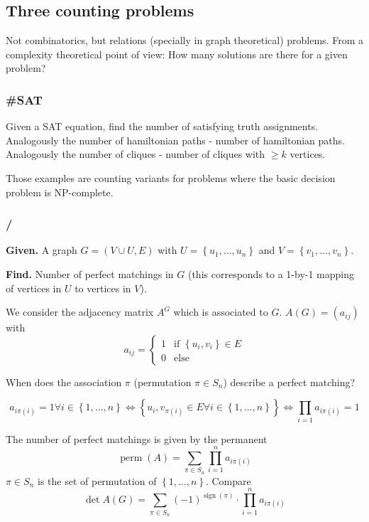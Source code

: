 \documentclass[a4paper]{article}
\newcommand{\given}[1]{\textbf{Given.} #1\par}
\newcommand{\find}[1]{\textbf{Find.} #1\par}
\newcommand{\cls}[1]{\rm{#1}}
\newcommand{\probl}[1]{\text{\textsc{#1}}}
\newcommand{\set}[1]{\left\{#1\right\}}
\newenvironment{spec}[0]{\begin{framed}}{\end{framed}}
\DeclareMathOperator{\detm}{det}
\begin{document}
\subsection{Three counting problems}
%
Not combinatorics, but relations (specially in graph theoretical) problems.
From a complexity theoretical point of view: How many solutions are there
for a given problem?

\subsubsection{\#SAT}
%
Given a SAT equation, find the number of satisfying truth assignments.
Analogously the number of hamiltonian paths - number of hamiltonian paths.
Analogously the number of cliques - number of cliques with $\geq k$ vertices.

Those examples are counting variants for problems where the basic decision problem
is \cls{NP}-complete.

\subsubsection{\probl{\#Matching} / \probl{Permanent}}
%
\begin{spec}
  \given{
    A graph $G = (V \cup U, E)$ with $U = \set{u_1, \ldots, u_n}$
    and $V = \set{v_1, \ldots, v_n}$.
  }
  \find{
    Number of perfect matchings in $G$
    (this corresponds to a 1-by-1 mapping of vertices in $U$ to vertices in $V$).
  }
\end{spec}

We consider the adjacency matrix $A^G$ which is associated to $G$.
$A(G) = (a_{ij})$ with \[
    a_{ij} = \begin{cases}
        1  & \text{if } \set{u_i, v_i} \in E \\
        0  & \text{else}
    \end{cases}
\]

When does the association $\pi$ (permutation $\pi \in S_n$) describe a perfect matching?

\[
    a_{i\pi(i)} = 1  \forall i \in \set{1, \ldots, n}
        \Leftrightarrow \set{u_i, v_{\pi(i)} \in E \forall i \in \set{1, \ldots, n}}
        \Leftrightarrow \prod_{i=1} a_{i\pi(i)} = 1
\]

The number of perfect matchings is given by the permanent
\[
    \operatorname{perm}(A) = \sum_{\pi \in S_n} \prod_{i=1}^n a_{i\pi(i)}
\]
$\pi \in S_n$ is the set of permutation of $\set{1, \ldots, n}$. Compare
\[
    \detm{A(G)} = \sum_{\pi \in S_n} (-1)^{\operatorname{sign}(\pi)}
        \cdot \prod_{i=1}^n a_{i\pi(i)}
\]
\end{document}
